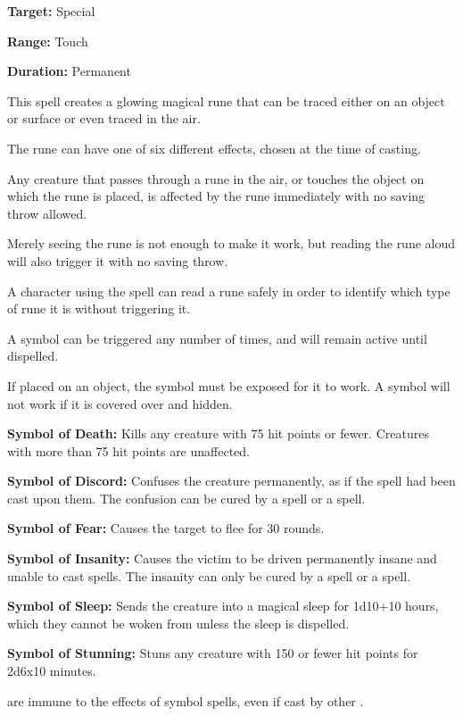 \begin{multicols*}{2}
{\textbf{Target:} Special

\textbf{Range:} Touch

\textbf{Duration:} Permanent}

This spell creates a glowing magical rune that can be traced either on an object or surface or even traced in the air.

The rune can have one of six different effects, chosen at the time of casting.

Any creature that passes through a rune in the air, or touches the object on which the rune is placed, is affected by the rune immediately with no saving throw allowed.

Merely seeing the rune is not enough to make it work, but reading the rune aloud will also trigger it with no saving throw.

A character using the  spell can read a rune safely in order to identify which type of rune it is without triggering it.

A symbol can be triggered any number of times, and will remain active until dispelled.

If placed on an object, the symbol must be exposed for it to work. A symbol will not work if it is covered over and hidden.

\textbf{Symbol of Death:} Kills any creature with 75 hit points or fewer. Creatures with more than 75 hit points are unaffected.

\textbf{Symbol of Discord:} Confuses the creature permanently, as if the  spell had been cast upon them. The confusion can be cured by a  spell or a  spell.

\textbf{Symbol of Fear:} Causes the target to flee for 30 rounds.

\textbf{Symbol of Insanity:} Causes the victim to be driven permanently insane and unable to cast spells. The insanity can only be cured by a  spell or a  spell.

\textbf{Symbol of Sleep:} Sends the creature into a magical sleep for 1d10+10 hours, which they cannot be woken from unless the sleep is dispelled.

\textbf{Symbol of Stunning:} Stuns any creature with 150 or fewer hit points for 2d6x10 minutes.

 are immune to the effects of symbol spells, even if cast by other .


\end{multicols*}
